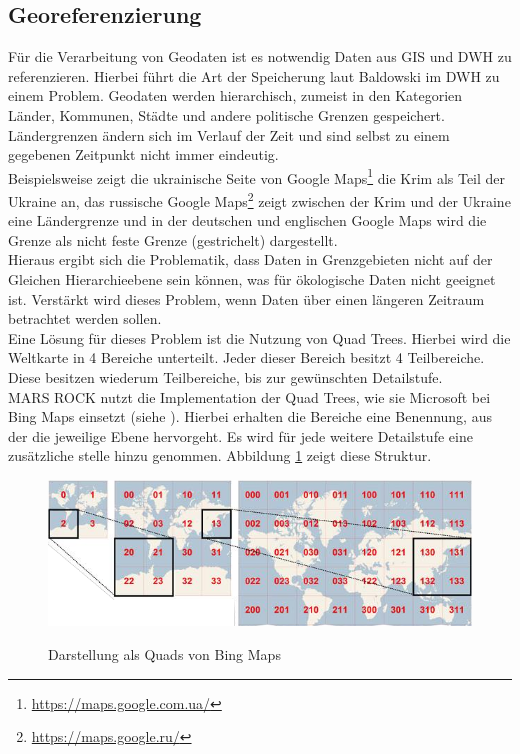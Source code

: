 \documentclass[10pt,conference,compsocconf]{IEEEtran}
\begin{document}
\subsection{Georeferenzierung}
Für die Verarbeitung von Geodaten ist es notwendig Daten aus GIS und DWH zu referenzieren. Hierbei führt die Art der Speicherung laut Baldowski\cite{mariuszMaster} im DWH zu einem Problem. Geodaten werden hierarchisch, zumeist in den Kategorien Länder, Kommunen, Städte und andere politische Grenzen gespeichert. Ländergrenzen ändern sich im Verlauf der Zeit und sind selbst zu einem gegebenen Zeitpunkt nicht immer eindeutig.\\
Beispielsweise zeigt die ukrainische Seite von Google Maps\footnote{\url{https://maps.google.com.ua/}} die Krim als Teil der Ukraine an, das russische Google Maps\footnote{\url{https://maps.google.ru/}} zeigt zwischen der Krim und der Ukraine eine Ländergrenze und in der deutschen und englischen Google Maps wird die Grenze als nicht feste Grenze (gestrichelt) dargestellt.\\
Hieraus ergibt sich die Problematik, dass Daten in Grenzgebieten nicht auf der Gleichen Hierarchieebene sein können, was für ökologische Daten nicht geeignet ist. Verstärkt wird dieses Problem, wenn Daten über einen längeren Zeitraum betrachtet werden sollen.\\
Eine Lösung für dieses Problem ist die Nutzung von Quad Trees\cite{quads}. Hierbei wird die Weltkarte in 4 Bereiche unterteilt. Jeder dieser Bereich besitzt 4 Teilbereiche. Diese besitzen wiederum Teilbereiche, bis zur gewünschten Detailstufe.\\
MARS ROCK nutzt die Implementation der Quad Trees, wie sie Microsoft bei Bing Maps einsetzt (siehe \cite{waldbiomasse}). Hierbei erhalten die Bereiche eine Benennung, aus der die jeweilige Ebene hervorgeht. Es wird für jede weitere Detailstufe eine zusätzliche stelle hinzu genommen. Abbildung \ref{img:bing_quads} zeigt diese Struktur.

\begin{figure}[H]
  \centering
  	\includegraphics[width=\columnwidth]{img/bing_quads}\\
  \caption[]{Darstellung als Quads von Bing Maps\cite{waldbiomasse}}
  \label{img:bing_quads}
\end{figure}
\end{document}

